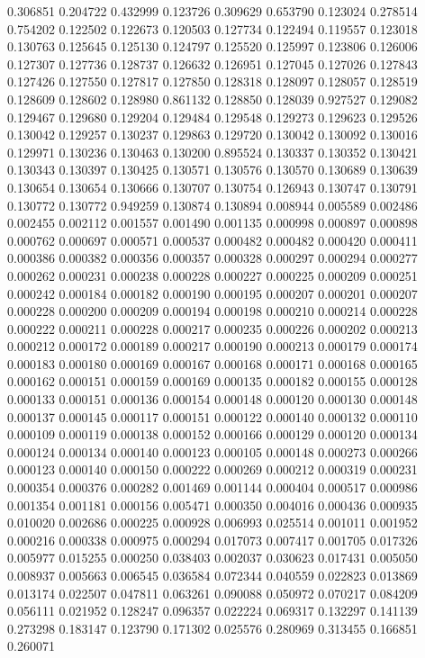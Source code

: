 0.306851
0.204722
0.432999
0.123726
0.309629
0.653790
0.123024
0.278514
0.754202
0.122502
0.122673
0.120503
0.127734
0.122494
0.119557
0.123018
0.130763
0.125645
0.125130
0.124797
0.125520
0.125997
0.123806
0.126006
0.127307
0.127736
0.128737
0.126632
0.126951
0.127045
0.127026
0.127843
0.127426
0.127550
0.127817
0.127850
0.128318
0.128097
0.128057
0.128519
0.128609
0.128602
0.128980
0.861132
0.128850
0.128039
0.927527
0.129082
0.129467
0.129680
0.129204
0.129484
0.129548
0.129273
0.129623
0.129526
0.130042
0.129257
0.130237
0.129863
0.129720
0.130042
0.130092
0.130016
0.129971
0.130236
0.130463
0.130200
0.895524
0.130337
0.130352
0.130421
0.130343
0.130397
0.130425
0.130571
0.130576
0.130570
0.130689
0.130639
0.130654
0.130654
0.130666
0.130707
0.130754
0.126943
0.130747
0.130791
0.130772
0.130772
0.949259
0.130874
0.130894
0.008944
0.005589
0.002486
0.002455
0.002112
0.001557
0.001490
0.001135
0.000998
0.000897
0.000898
0.000762
0.000697
0.000571
0.000537
0.000482
0.000482
0.000420
0.000411
0.000386
0.000382
0.000356
0.000357
0.000328
0.000297
0.000294
0.000277
0.000262
0.000231
0.000238
0.000228
0.000227
0.000225
0.000209
0.000251
0.000242
0.000184
0.000182
0.000190
0.000195
0.000207
0.000201
0.000207
0.000228
0.000200
0.000209
0.000194
0.000198
0.000210
0.000214
0.000228
0.000222
0.000211
0.000228
0.000217
0.000235
0.000226
0.000202
0.000213
0.000212
0.000172
0.000189
0.000217
0.000190
0.000213
0.000179
0.000174
0.000183
0.000180
0.000169
0.000167
0.000168
0.000171
0.000168
0.000165
0.000162
0.000151
0.000159
0.000169
0.000135
0.000182
0.000155
0.000128
0.000133
0.000151
0.000136
0.000154
0.000148
0.000120
0.000130
0.000148
0.000137
0.000145
0.000117
0.000151
0.000122
0.000140
0.000132
0.000110
0.000109
0.000119
0.000138
0.000152
0.000166
0.000129
0.000120
0.000134
0.000124
0.000134
0.000140
0.000123
0.000105
0.000148
0.000273
0.000266
0.000123
0.000140
0.000150
0.000222
0.000269
0.000212
0.000319
0.000231
0.000354
0.000376
0.000282
0.001469
0.001144
0.000404
0.000517
0.000986
0.001354
0.001181
0.000156
0.005471
0.000350
0.004016
0.000436
0.000935
0.010020
0.002686
0.000225
0.000928
0.006993
0.025514
0.001011
0.001952
0.000216
0.000338
0.000975
0.000294
0.017073
0.007417
0.001705
0.017326
0.005977
0.015255
0.000250
0.038403
0.002037
0.030623
0.017431
0.005050
0.008937
0.005663
0.006545
0.036584
0.072344
0.040559
0.022823
0.013869
0.013174
0.022507
0.047811
0.063261
0.090088
0.050972
0.070217
0.084209
0.056111
0.021952
0.128247
0.096357
0.022224
0.069317
0.132297
0.141139
0.273298
0.183147
0.123790
0.171302
0.025576
0.280969
0.313455
0.166851
0.260071
